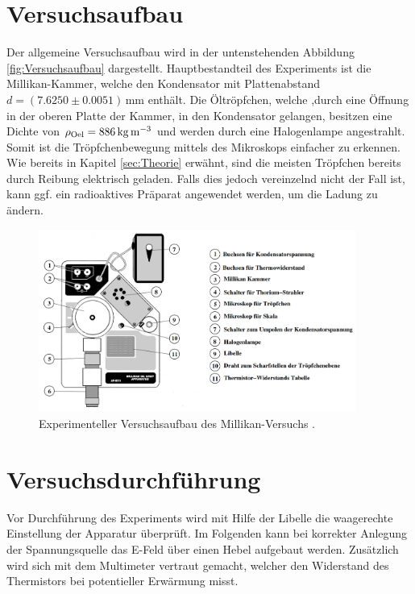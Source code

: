 



\section{Versuchsaufbau}
\label{sec:Versuchsaufbau}

\noindent Der allgemeine Versuchsaufbau wird in der untenstehenden Abbildung \ref{fig:Versuchsaufbau} dargestellt. Hauptbestandteil des Experiments
ist die Millikan-Kammer, welche den Kondensator mit Plattenabstand $d = \left(7.6250\pm0.0051\right)
\,\unit{\milli\meter}$ enthält. Die Öltröpfchen, welche ,durch eine Öffnung in der oberen Platte der Kammer,
in den Kondensator gelangen, besitzen eine Dichte von $\rho_\text{Oel}= 886\,\unit[per-mode=reciprocal]{\kilo\gram\per\cubic\meter}$ und 
werden durch eine Halogenlampe angestrahlt. Somit ist die Tröpfchenbewegung mittels des Mikroskops einfacher zu erkennen. Wie bereits 
in Kapitel \ref{sec:Theorie} erwähnt, sind die meisten Tröpfchen bereits durch Reibung elektrisch geladen. Falls dies 
jedoch vereinzelnd nicht der Fall ist, kann ggf. ein radioaktives Präparat angewendet werden, um die Ladung zu ändern.

\begin{figure}
    \centering 
    \includegraphics[height=6cm]{Aufbau.png}
    \caption{Experimenteller Versuchsaufbau des Millikan-Versuchs \cite{Versuchsanleitung_v503}.}
    \label{fig:Aufbau}
\end{figure}

\section{Versuchsdurchführung}
\label{sec:Versuchsdurchführung}

\noindent Vor Durchführung des Experiments wird mit Hilfe der Libelle die waagerechte Einstellung der Apparatur überprüft. Im 
Folgenden kann bei korrekter Anlegung der Spannungsquelle das E-Feld über einen Hebel aufgebaut werden. Zusätzlich wird sich mit 
dem Multimeter vertraut gemacht, welcher den Widerstand des Thermistors bei potentieller Erwärmung misst.\\

